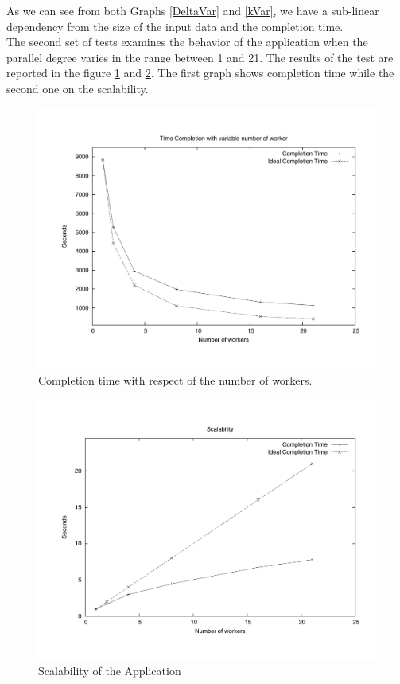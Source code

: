 As we can see from both Graphs \ref{DeltaVar} and \ref{kVar}, we have a sub-linear dependency from the size of the input data and the completion time. \\

The second set of tests examines the behavior of the application when the parallel degree varies in the range between 1 and 21. 
The results of the test are reported in the figure \ref{NTime}  and \ref{NScal}. 
The first graph shows completion time while the second one on the scalability.

\begin{figure}[th]
	\centerline{
		\mbox{\includegraphics[scale=0.48]{HadoopTest/PsFiles/NTime.pdf}}
	}
	\caption{Completion time with respect of the number of workers.} 
        \label{NTime}
\end{figure}

\begin{figure}[th]
	\centerline{
		\mbox{\includegraphics[scale=0.48]{HadoopTest/PsFiles/NScal.pdf}}
	}
	\caption{Scalability of the Application} 
        \label{NScal}
\end{figure}

